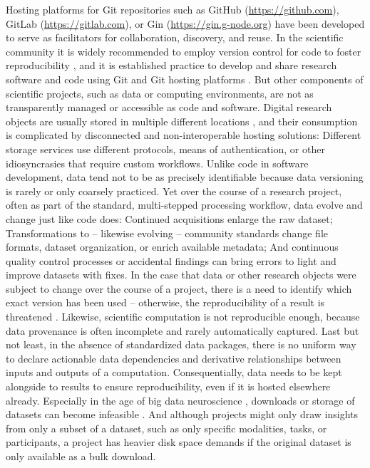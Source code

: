 Hosting platforms for Git repositories such as GitHub (\url{https://github.com}), GitLab ({\url{https://gitlab.com}), or Gin (\url{https://gin.g-node.org}) have been developed to serve as facilitators for collaboration, discovery, and reuse.
In the scientific community it is widely recommended to employ version control for code to foster reproducibility \citep[e.g.,][]{sandve2013ten}, and it is established practice to develop and share research software and code using Git and Git hosting platforms \citep[e.g.,][]{nord2019towards, strupler2017reproducibility, bryan2018excuse, corti2019managing}.
But other components of scientific projects, such as data or computing environments, are not as transparently managed or accessible as code and software.
Digital research objects are usually stored in multiple different locations \citep{parsons2013research}, and their consumption is complicated by disconnected and non-interoperable hosting solutions:
Different storage services use different protocols, means of authentication, or other idiosyncrasies that require custom workflows.
Unlike code in software development, data tend not to be as precisely identifiable because data versioning is rarely or only coarsely practiced.
Yet over the course of a research project, often as part of the standard, multi-stepped processing workflow, data evolve and change just like code does:
Continued acquisitions enlarge the raw dataset; Transformations to -- likewise evolving -- community standards change file formats, dataset organization, or enrich available metadata; And continuous quality control processes or accidental findings can bring errors to light and improve datasets with fixes.
In the case that data or other research objects were subject to change over the course of a project, there is a need to identify which exact version has been used -- otherwise, the reproducibility of a result is threatened \citep{hardwicke2018data}.
Likewise, scientific computation is not reproducible enough, because data provenance is often incomplete and rarely automatically captured.
Last but not least, in the absence of standardized data packages, there is no uniform way to declare actionable
data dependencies and derivative relationships between inputs and outputs of a computation.
Consequentially, data needs to be kept alongside to results to ensure reproducibility, even if it is hosted elsewhere already.
Especially in the age of big data neuroscience \citep{bzdok2017inference}, downloads or storage of datasets can become infeasible \citep{horien2021hitchhiker, grisham2016proposed}.
And although projects might only draw insights from only a subset of a dataset, such as only specific modalities, tasks, or participants, a project has heavier disk space demands if the original dataset is only available as a bulk download.\\
}
